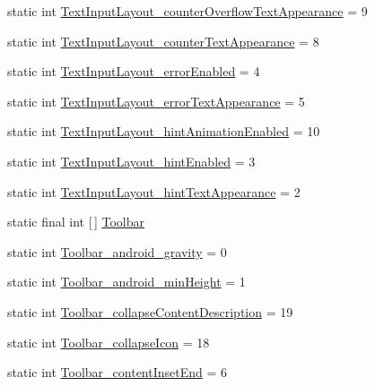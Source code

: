 \begin{DoxyCompactItemize}
\item 
static int \hyperlink{classandroid_1_1support_1_1design_1_1R_1_1styleable_a3edf526a4c547c24a4dbce7a67d32646}{Text\+Input\+Layout\+\_\+counter\+Overflow\+Text\+Appearance} = 9
\item 
static int \hyperlink{classandroid_1_1support_1_1design_1_1R_1_1styleable_ad31b5989bc5b2edce56f3e8277c50502}{Text\+Input\+Layout\+\_\+counter\+Text\+Appearance} = 8
\item 
static int \hyperlink{classandroid_1_1support_1_1design_1_1R_1_1styleable_af41f85d64b3b697a4733e3d4aa3d0f38}{Text\+Input\+Layout\+\_\+error\+Enabled} = 4
\item 
static int \hyperlink{classandroid_1_1support_1_1design_1_1R_1_1styleable_a6082781f4ba58bfcd9d7ce5d018a470a}{Text\+Input\+Layout\+\_\+error\+Text\+Appearance} = 5
\item 
static int \hyperlink{classandroid_1_1support_1_1design_1_1R_1_1styleable_a5bcfd0299af354869ae56b7577ec35e9}{Text\+Input\+Layout\+\_\+hint\+Animation\+Enabled} = 10
\item 
static int \hyperlink{classandroid_1_1support_1_1design_1_1R_1_1styleable_a164a51b99de4318938aea1e4cb2252a1}{Text\+Input\+Layout\+\_\+hint\+Enabled} = 3
\item 
static int \hyperlink{classandroid_1_1support_1_1design_1_1R_1_1styleable_a2598a54f9e9d2a6238931ce0ae9b6bcc}{Text\+Input\+Layout\+\_\+hint\+Text\+Appearance} = 2
\item 
static final int \mbox{[}$\,$\mbox{]} \hyperlink{classandroid_1_1support_1_1design_1_1R_1_1styleable_a7783ebe780dbe2a845802a40519a46e9}{Toolbar}
\item 
static int \hyperlink{classandroid_1_1support_1_1design_1_1R_1_1styleable_a284a71ada839c36b151c703e6669cb1f}{Toolbar\+\_\+android\+\_\+gravity} = 0
\item 
static int \hyperlink{classandroid_1_1support_1_1design_1_1R_1_1styleable_a896491cbc15c41005ac0372a7652eb54}{Toolbar\+\_\+android\+\_\+min\+Height} = 1
\item 
static int \hyperlink{classandroid_1_1support_1_1design_1_1R_1_1styleable_a89d74d3552a12cf237615786e552301a}{Toolbar\+\_\+collapse\+Content\+Description} = 19
\item 
static int \hyperlink{classandroid_1_1support_1_1design_1_1R_1_1styleable_ab8736925c114eaeba368273e6f851ae8}{Toolbar\+\_\+collapse\+Icon} = 18
\item 
static int \hyperlink{classandroid_1_1support_1_1design_1_1R_1_1styleable_a0ed60bf0f8960c63916d30821f0bca48}{Toolbar\+\_\+content\+Inset\+End} = 6

\end{DoxyCompactItemize}
